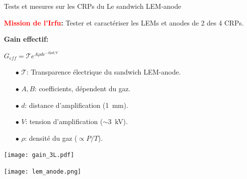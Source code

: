     \begin{frame}{Tests et mesures sur les CRPs du \SSS{}}{Le sandwich LEM-anode}
	    	\begin{scriptsize}
			     \textbf{\textcolor{red}{Mission de l'Irfu}: }Tester et caractériser les  LEMs et anodes de 2 des 4 CRPs.\\\vfill
			\end{scriptsize}
	   		\begin{minipage}{0.48\textwidth}
	   			\begin{scriptsize}
		   			\textbf{Gain effectif:}\\
		   		\end{scriptsize}
	   			$G_{eff} = \mathcal{T}e^{A\rho d e^{-B\rho d/V}}$\\
	   			\begin{scriptsize}
	    			\begin{itemize}
	    				\item[$\bullet$] $\mathcal{T}$: Transparence électrique du sandwich LEM-anode.
	    				\item[$\bullet$] $A,B$: coefficients, dépendent du gaz.
	    				\item[$\bullet$] $d$: distance d'amplification (\SI{1}{\milli\meter}).
	    				\item[$\bullet$] $V$: tension d'amplification ($\sim$\SI{3}{\kilo\volt}).
	    				\item[$\bullet$] $\rho$: densité du gaz ($\propto P/T$).
	    			\end{itemize}
	    		\end{scriptsize} 
	   			\vfill
                \centering
				\texttt{[image: gain\_3L.pdf]}
	   		\end{minipage}\hfill
	   		\begin{minipage}{0.48\textwidth}
	   			\texttt{[image: lem\_anode.png]}
	   		\end{minipage}
    \end{frame}


